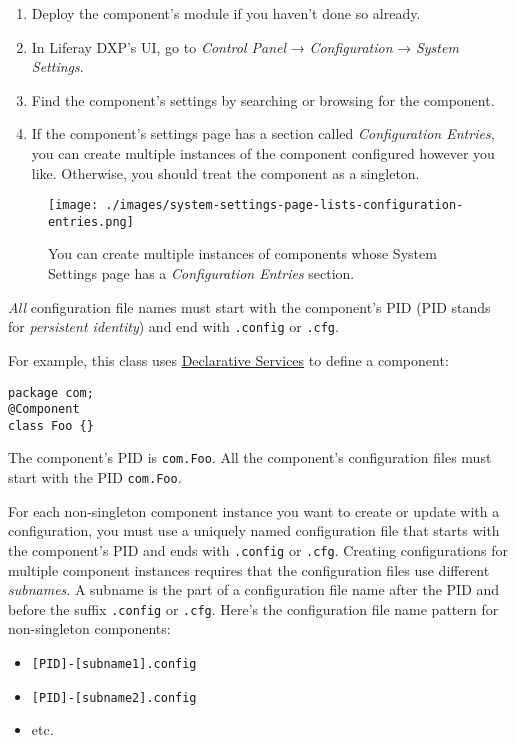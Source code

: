 \begin{enumerate}
\def\labelenumi{\arabic{enumi}.}
\item
  Deploy the component's module if you haven't done so already.
\item
  In Liferay DXP's UI, go to \emph{Control Panel} → \emph{Configuration}
  → \emph{System Settings}.
\item
  Find the component's settings by searching or browsing for the
  component.
\item
  If the component's settings page has a section called
  \emph{Configuration Entries}, you can create multiple instances of the
  component configured however you like. Otherwise, you should treat the
  component as a singleton.
\end{enumerate}

\begin{figure}
\centering
\texttt{[image: ./images/system-settings-page-lists-configuration-entries.png]}
\caption{You can create multiple instances of components whose System
Settings page has a \emph{Configuration Entries} section.}
\end{figure}

\emph{All} configuration file names must start with the component's PID
(PID stands for \emph{persistent identity}) and end with
\texttt{.config} or \texttt{.cfg}.

For example, this class uses
\href{/docs/7-2/frameworks/-/knowledge_base/f/declarative-services}{Declarative
Services} to define a component:

\begin{verbatim}
package com;
@Component
class Foo {}
\end{verbatim}

The component's PID is \texttt{com.Foo}. All the component's
configuration files must start with the PID \texttt{com.Foo}.

For each non-singleton component instance you want to create or update
with a configuration, you must use a uniquely named configuration file
that starts with the component's PID and ends with \texttt{.config} or
\texttt{.cfg}. Creating configurations for multiple component instances
requires that the configuration files use different \emph{subnames}. A
subname is the part of a configuration file name after the PID and
before the suffix \texttt{.config} or \texttt{.cfg}. Here's the
configuration file name pattern for non-singleton components:

\begin{itemize}
\tightlist
\item
  \texttt{{[}PID{]}-{[}subname1{]}.config}
\item
  \texttt{{[}PID{]}-{[}subname2{]}.config}
\item
  etc.
\end{itemize}

